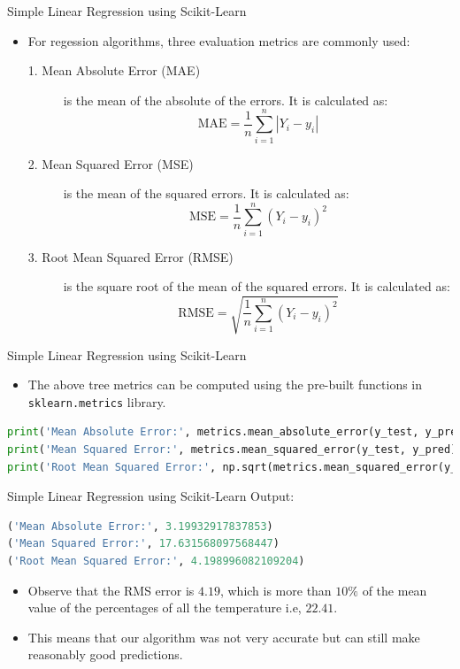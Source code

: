 \documentclass[12pt,xcolor={dvipsnames}]{beamer}
\begin{document}
\begin{frame}[shrink=20]{Simple Linear Regression using Scikit-Learn}
\begin{itemize}
\item For regession algorithms, three evaluation metrics are commonly used:
\begin{description}
  \item[1. Mean Absolute Error (MAE)] is the mean of the absolute of the errors. It is calculated as:
  $$\text{MAE} = \frac{1}{n}\sum\limits_{i=1}^n \left|Y_i - y_i\right|$$
  \item[2. Mean Squared Error (MSE)] is the mean of the squared errors. It is calculated as:
  $$\text{MSE} = \frac{1}{n}\sum\limits_{i=1}^n \left(Y_i - y_i\right)^2$$
  \item[3. Root Mean Squared Error (RMSE)] is the square root of the mean of the squared errors. It is calculated as:
  $$\text{RMSE} = \sqrt{\frac{1}{n}\sum\limits_{i=1}^n \left(Y_i - y_i\right)^2}$$
\end{description}
\end{itemize}
\end{frame}

\begin{frame}[fragile]{Simple Linear Regression using Scikit-Learn}
\begin{itemize}
\item The above tree metrics can be computed using the pre-built functions in \lstinline[language=Python]!sklearn.metrics! library.
\end{itemize}
\begin{lstlisting}[language=Python]
print('Mean Absolute Error:', metrics.mean_absolute_error(y_test, y_pred))
print('Mean Squared Error:', metrics.mean_squared_error(y_test, y_pred))
print('Root Mean Squared Error:', np.sqrt(metrics.mean_squared_error(y_test, y_pred)))
\end{lstlisting}
\end{frame}

\begin{frame}[fragile]{Simple Linear Regression using Scikit-Learn}
Output:
\begin{lstlisting}[language=Python]
('Mean Absolute Error:', 3.19932917837853)
('Mean Squared Error:', 17.631568097568447)
('Root Mean Squared Error:', 4.198996082109204)
\end{lstlisting}
\begin{itemize}
\item Observe that the RMS error is $4.19$, which is more than $10\%$ of the mean value of the percentages of all the temperature i.e, $22.41$.
\item This means that our algorithm was not very accurate but can still make reasonably good predictions.
\end{itemize}
\end{frame}
\end{document}
